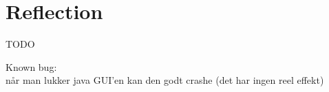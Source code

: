 
\section{Reflection}

TODO

Known bug: \\
når man lukker java GUI'en kan den godt crashe (det har ingen reel effekt)
